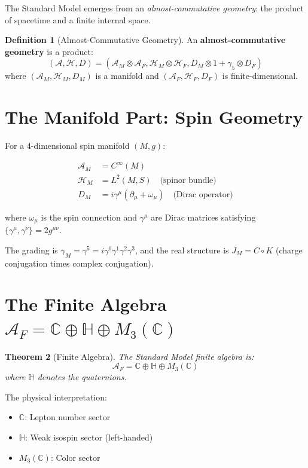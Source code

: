 \documentclass[11pt,a4paper,openright]{book}
\theoremstyle{plain}
\newtheorem{theorem}{Theorem}[chapter]
\theoremstyle{definition}
\newtheorem{definition}[theorem]{Definition}
\newcommand{\Hil}{\mathcal{H}}
\newcommand{\A}{\mathcal{A}}
\newcommand{\C}{\mathbb{C}}
\begin{document}
The Standard Model emerges from an \emph{almost-commutative geometry}: the product of spacetime and a finite internal space.

\begin{definition}[Almost-Commutative Geometry]
An \textbf{almost-commutative geometry} is a product:
\begin{equation}
(\A, \Hil, D) = (\A_M \otimes \A_F, \Hil_M \otimes \Hil_F, D_M \otimes 1 + \gamma_5 \otimes D_F)
\end{equation}
where $(\A_M, \Hil_M, D_M)$ is a manifold and $(\A_F, \Hil_F, D_F)$ is finite-dimensional.
\end{definition}

\section{The Manifold Part: Spin Geometry}

For a 4-dimensional spin manifold $(M, g)$:

\begin{align}
\A_M &= C^\infty(M) \\
\Hil_M &= L^2(M, S) \quad \text{(spinor bundle)} \\
D_M &= i\gamma^\mu(\partial_\mu + \omega_\mu) \quad \text{(Dirac operator)}
\end{align}

where $\omega_\mu$ is the spin connection and $\gamma^\mu$ are Dirac matrices satisfying $\{\gamma^\mu, \gamma^\nu\} = 2g^{\mu\nu}$.

The grading is $\gamma_M = \gamma^5 = i\gamma^0\gamma^1\gamma^2\gamma^3$, and the real structure is $J_M = C \circ K$ (charge conjugation times complex conjugation).

\section{The Finite Algebra $\A_F = \C \oplus \mathbb{H} \oplus M_3(\C)$}

\begin{theorem}[Finite Algebra]
The Standard Model finite algebra is:
\begin{equation}
\A_F = \C \oplus \mathbb{H} \oplus M_3(\C)
\end{equation}
where $\mathbb{H}$ denotes the quaternions.
\end{theorem}

The physical interpretation:
\begin{itemize}
    \item $\C$: Lepton number sector
    \item $\mathbb{H}$: Weak isospin sector (left-handed)
    \item $M_3(\C)$: Color sector
\end{itemize}
\end{document}
